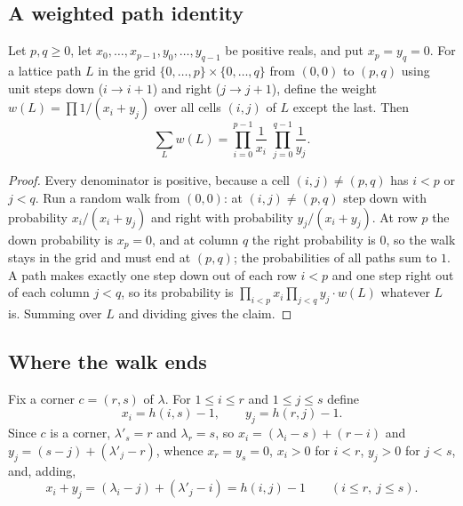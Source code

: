 \documentclass[11pt]{article}
\begin{document}
\subsection{A weighted path identity}
\begin{theorembox}[Lemma 1]
Let $p,q\ge0$, let $x_0,\dots,x_{p-1},y_0,\dots,y_{q-1}$ be positive reals, and put $x_p=y_q=0$. For a lattice path $L$ in the grid $\{0,\dots,p\}\times\{0,\dots,q\}$ from $(0,0)$ to $(p,q)$ using unit steps down ($i\to i+1$)
and right ($j\to j+1$), define the weight $w(L)=\prod 1/(x_i+y_j)$ over all cells $(i,j)$ of $L$ except the last. Then
\[
  \sum_{L}w(L)=\prod_{i=0}^{p-1}\frac1{x_i}\;\prod_{j=0}^{q-1}\frac1{y_j}.
\]
\end{theorembox}
\begin{proof}
Every denominator is positive, because a cell $(i,j)\ne(p,q)$ has $i<p$ or $j<q$. Run a random walk from $(0,0)$: at $(i,j)\ne(p,q)$ step down with probability $x_i/(x_i+y_j)$ and right with probability $y_j/(x_i+y_j)$.
At row $p$ the down probability is $x_p=0$, and at column $q$ the right probability is $0$, so the walk stays in the grid and must end at $(p,q)$; the probabilities of all paths sum to $1$.
A path makes exactly one step down out of each row $i<p$ and one step right out of each column $j<q$, so its probability is $\prod_{i<p}x_i\prod_{j<q}y_j\cdot w(L)$ whatever $L$ is. Summing over $L$ and dividing gives the claim.
\end{proof}

\subsection{Where the walk ends}
Fix a corner $c=(r,s)$ of $\lambda$. For $1\le i\le r$ and $1\le j\le s$ define
\[
  x_i=h(i,s)-1,\qquad y_j=h(r,j)-1 .
\]
Since $c$ is a corner, $\lambda'_s=r$ and $\lambda_r=s$, so $x_i=(\lambda_i-s)+(r-i)$ and $y_j=(s-j)+(\lambda'_j-r)$, whence $x_r=y_s=0$, $x_i>0$ for $i<r$, $y_j>0$ for $j<s$, and, adding,
\begin{equation}\label{eq:sum}
  x_i+y_j=(\lambda_i-j)+(\lambda'_j-i)=h(i,j)-1\qquad(i\le r,\ j\le s).
\end{equation}
\end{document}
